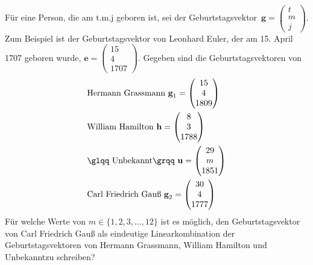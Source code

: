 \subsection*{}
Für eine Person, die am t.m.j geboren ist, sei der \glqq Geburtstagsvektor\grqq \ $ \textbf{g} = 
\begin{pmatrix}
t \\ m \\ j
\end{pmatrix}
 $.
Zum Beispiel ist der Geburtstagsvektor von Leonhard Euler, der am 15. April 1707 geboren wurde, $ \textbf{e} =
\begin{pmatrix}
15 \\ 4 \\ 1707
\end{pmatrix}
 $.
Gegeben sind die Geburtstagsvektoren von
\begin{align*}
&\textrm{Hermann Grassmann } 
\textbf{g}_1 =
\begin{pmatrix}
15 \\ 4 \\ 1809
\end{pmatrix}\\
&\textrm{William Hamilton } 
\textbf{h} =
\begin{pmatrix}
8 \\ 3 \\ 1788
\end{pmatrix}\\
&\textrm{\glqq Unbekannt\grqq } 
\textbf{u} =
\begin{pmatrix}
29 \\ m \\ 1851
\end{pmatrix}\\
&\textrm{Carl Friedrich Gauß } 
\textbf{g}_2 =
\begin{pmatrix}
30 \\ 4 \\ 1777
\end{pmatrix}
\end{align*} 
Für welche Werte von $ m \in \{1,2,3,...,12 \} $ ist es möglich, den Geburtstagsvektor von Carl Friedrich Gauß als eindeutige Linearkombination der Geburtstagsvektoren von Hermann Grassmann, William Hamilton und \glqq Unbekannt\grqq zu schreiben?
\\ \\
